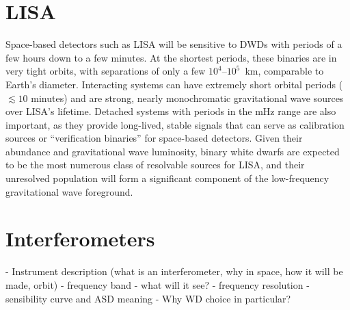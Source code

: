 \section{LISA}

Space-based detectors such as LISA will be sensitive to DWDs with periods of a few hours down to a few minutes.  
At the shortest periods, these binaries are in very tight orbits, with separations of only a few $10^{4}$–$10^{5}$~km, comparable to Earth's diameter.
Interacting systems can have extremely short orbital periods ($\lesssim 10$ minutes) and are strong, nearly monochromatic gravitational wave sources over LISA's lifetime.  
Detached systems with periods in the mHz range are also important, as they provide long-lived, stable signals that can serve as calibration sources or ``verification binaries'' for space-based detectors.
Given their abundance and gravitational wave luminosity, binary white dwarfs are expected to be the most numerous class of resolvable sources for LISA, and their unresolved population will form a significant component of the low-frequency gravitational wave foreground.

\section{Interferometers}



- Instrument description (what is an interferometer, why in space, how it will be made, orbit)
- frequency band - what will it see?
- frequency resolution
- sensibility curve and ASD meaning
- Why WD choice in particular?

